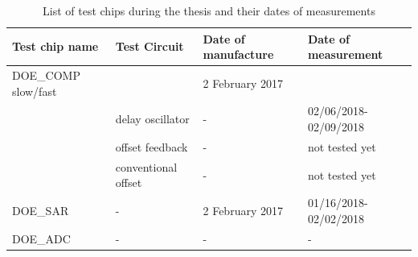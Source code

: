 \begin{table}[htp]
    \caption{List of test chips during the thesis and their dates of measurements}
    \label{tbl:test-chip-list-and-dates}
    \begin{tabular}{@{}llll@{}}
    \toprule
    Test chip name      & Test Circuit        & Date of manufacture & Date of measurement   \\ \midrule
    DOE\_COMP slow/fast &                     & 2 February 2017     &                       \\
                        & delay oscillator    & -                   & 02/06/2018-02/09/2018 \\
                        & offset feedback     & -                   & not tested yet        \\
                        & conventional offset & -                   & not tested yet        \\
    DOE\_SAR            & -                   & 2 February 2017     & 01/16/2018-02/02/2018 \\
    DOE\_ADC            & -                   & -                   & -                     \\ \bottomrule
    \end{tabular}
\end{table}

